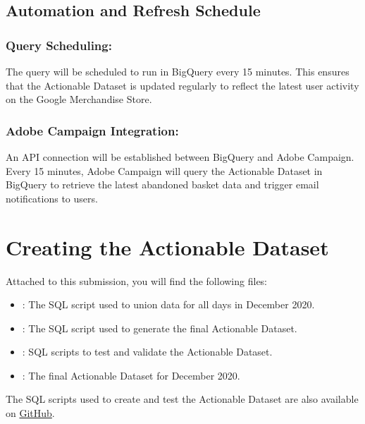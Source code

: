 \documentclass[a4paper,11pt,leqno,openbib,oldfontcommands,oneside]{memoir}
\begin{document}
\subsection{Automation and Refresh Schedule}

\subsubsection{Query Scheduling:}
The query will be scheduled to run in BigQuery every 15 minutes. This ensures that the Actionable Dataset is updated regularly to reflect the latest user activity on the Google Merchandise Store.

\subsubsection{Adobe Campaign Integration:}
An API connection will be established between BigQuery and Adobe Campaign. Every 15 minutes, Adobe Campaign will query the Actionable Dataset in BigQuery to retrieve the latest abandoned basket data and trigger email notifications to users.

\section{Creating the Actionable Dataset}
\label{sec:Part3}

Attached to this submission, you will find the following files:

\begin{itemize}
    \item {}: The SQL script used to union data for all days in December 2020.
    \item {}: The SQL script used to generate the final Actionable Dataset.
    \item {}: SQL scripts to test and validate the Actionable Dataset.
    \item {}: The final Actionable Dataset for December 2020.
\end{itemize}

\vspace{5pt}

\noindent The SQL scripts used to create and test the Actionable Dataset are also available on \href{https://bit.ly/basket-abandonment}{GitHub}.
\end{document}
